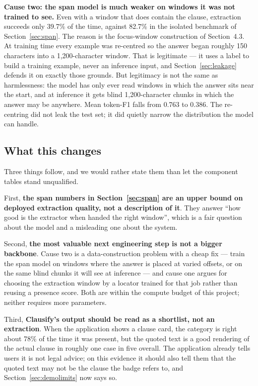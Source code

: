 \textbf{Cause two: the span model is much weaker on windows it was not trained to see.} Even with a window that does contain the clause, extraction succeeds only 39.7\% of the time, against 82.7\% in the isolated benchmark of Section~\ref{sec:span}. The reason is the focus-window construction of Section~4.3. At training time every example was re-centred so the answer began roughly 150 characters into a 1{,}200-character window. That is legitimate --- it uses a label to build a training example, never an inference input, and Section~\ref{sec:leakage} defends it on exactly those grounds. But legitimacy is not the same as harmlessness: the model has only ever read windows in which the answer sits near the start, and at inference it gets blind 1{,}200-character chunks in which the answer may be anywhere. Mean token-F1 falls from 0.763 to 0.386. The re-centring did not leak the test set; it did quietly narrow the distribution the model can handle.

\subsection{What this changes}
Three things follow, and we would rather state them than let the component tables stand unqualified.

First, \textbf{the span numbers in Section~\ref{sec:span} are an upper bound on deployed extraction quality, not a description of it}. They answer ``how good is the extractor when handed the right window'', which is a fair question about the model and a misleading one about the system.

Second, \textbf{the most valuable next engineering step is not a bigger backbone}. Cause two is a data-construction problem with a cheap fix --- train the span model on windows where the answer is placed at varied offsets, or on the same blind chunks it will see at inference --- and cause one argues for choosing the extraction window by a locator trained for that job rather than reusing a presence score. Both are within the compute budget of this project; neither requires more parameters.

Third, \textbf{Clausify's output should be read as a shortlist, not an extraction}. When the application shows a clause card, the category is right about 78\% of the time it was present, but the quoted text is a good rendering of the actual clause in roughly one case in five overall. The application already tells users it is not legal advice; on this evidence it should also tell them that the quoted text may not be the clause the badge refers to, and Section~\ref{sec:demolimits} now says so.

